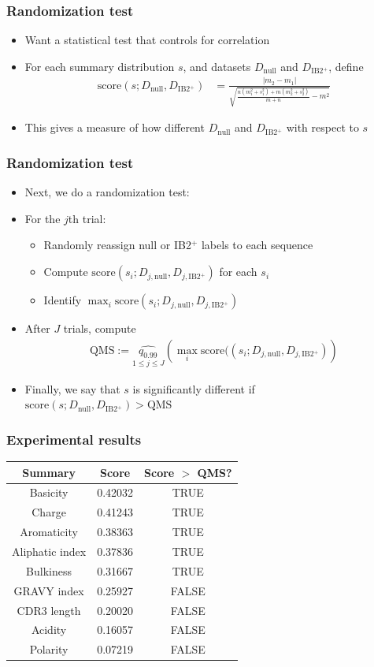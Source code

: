 \documentclass[mathserif,compress]{beamer}
\newcommand*\ba{\[ \begin{aligned}}
\newcommand*\ea{\end{aligned} \]}
\renewcommand\;{\,}
\begin{document}
\begin{frame}\frametitle{Randomization test}
\begin{itemize}
\item
Want a statistical test that controls for correlation
\bigskip
\item
For each summary distribution $s$, and datasets $D_\text{null}$ and $D_\text{IB2$^+$}$, define
\ba
\text{score}(s; D_\text{null}, D_\text{IB2$^+$})
	& = \frac{|m_2 - m_1|}
		{ \sqrt{ \frac{n(m_1^2 + s_1^2) + m(m_2^2 + s_2^2)}{m + n} - m^2 } }
\ea
\item
This gives a measure of how different $D_\text{null}$ and $D_\text{IB2$^+$}$ with respect to $s$
\end{itemize}
\end{frame}

\begin{frame}\frametitle{Randomization test}
\begin{itemize}
\item[]
Next, we do a randomization test:
\bigskip
\smallskip
\item[]
For the $j$th trial: 
\begin{itemize}
\item
Randomly reassign null or IB2$^+$ labels to each sequence
\bigskip
\item
Compute $\text{score}(s_i; D_{j, \text{null}}, D_{j, \text{IB2$^+$}})$ for each $s_i$
\item
\bigskip
Identify $\max_i \text{score}(s_i; D_{j, \text{null}}, D_{j, \text{IB2$^+$}})$
\end{itemize}
\bigskip
\item[]
After $J$ trials, compute
\ba
\text{QMS} := \underset{1 \le j \le J}{\widehat{q_{0.99}}} \left(
	\max_i \text{score}( (s_i; D_{j, \text{null}}, D_{j, \text{IB2$^+$}})
	\right)
\ea
\item[]
Finally, we say that $s$ is significantly different if 
$\text{score}(s; D_\text{null}, D_\text{IB2$^+$})
	> \text{QMS}$

\end{itemize}
\end{frame}

\begin{frame}\frametitle{Experimental results}
\begin{center}
\begin{tabular}{c|c|c}
Summary & Score & Score $>$ QMS? \\
\hline
Basicity & 0.42032 & TRUE \\
Charge & 0.41243 & TRUE \\
Aromaticity & 0.38363 & TRUE \\
Aliphatic index & 0.37836 & TRUE \\
Bulkiness & 0.31667 & TRUE \\
GRAVY index & 0.25927 & FALSE \\
CDR3 length & 0.20020 & FALSE \\
Acidity & 0.16057 & FALSE \\
Polarity & 0.07219 & FALSE \\
\end{tabular}
\end{center}
\end{frame}
\end{document}
